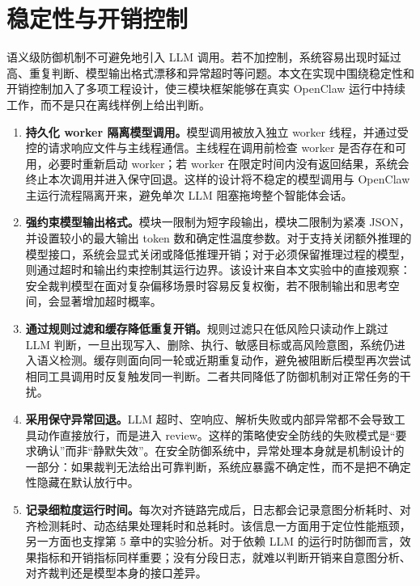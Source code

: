 \section{稳定性与开销控制}

语义级防御机制不可避免地引入 LLM 调用。若不加控制，系统容易出现时延过高、重复判断、模型输出格式漂移和异常超时等问题。本文在实现中围绕稳定性和开销控制加入了多项工程设计，使三模块框架能够在真实 OpenClaw 运行中持续工作，而不是只在离线样例上给出判断。

\begin{enumerate}[label=\arabic*., leftmargin=2.2em]
  \item \textbf{持久化 worker 隔离模型调用。}模型调用被放入独立 worker 线程，并通过受控的请求响应文件与主线程通信。主线程在调用前检查 worker 是否存在和可用，必要时重新启动 worker；若 worker 在限定时间内没有返回结果，系统会终止本次调用并进入保守回退。这样的设计将不稳定的模型调用与 OpenClaw 主运行流程隔离开来，避免单次 LLM 阻塞拖垮整个智能体会话。

  \item \textbf{强约束模型输出格式。}模块一限制为短字段输出，模块二限制为紧凑 JSON，并设置较小的最大输出 token 数和确定性温度参数。对于支持关闭额外推理的模型接口，系统会显式关闭或降低推理开销；对于必须保留推理过程的模型，则通过超时和输出约束控制其运行边界。该设计来自本文实验中的直接观察：安全裁判模型在面对复杂偏移场景时容易反复权衡，若不限制输出和思考空间，会显著增加超时概率。

  \item \textbf{通过规则过滤和缓存降低重复开销。}规则过滤只在低风险只读动作上跳过 LLM 判断，一旦出现写入、删除、执行、敏感目标或高风险意图，系统仍进入语义检测。缓存则面向同一轮或近期重复动作，避免被阻断后模型再次尝试相同工具调用时反复触发同一判断。二者共同降低了防御机制对正常任务的干扰。

  \item \textbf{采用保守异常回退。}LLM 超时、空响应、解析失败或内部异常都不会导致工具动作直接放行，而是进入 review。这样的策略使安全防线的失败模式是“要求确认”而非“静默失效”。在安全防御系统中，异常处理本身就是机制设计的一部分：如果裁判无法给出可靠判断，系统应暴露不确定性，而不是把不确定性隐藏在默认放行中。

  \item \textbf{记录细粒度运行时间。}每次对齐链路完成后，日志都会记录意图分析耗时、对齐检测耗时、动态结果处理耗时和总耗时。该信息一方面用于定位性能瓶颈，另一方面也支撑第 5 章中的实验分析。对于依赖 LLM 的运行时防御而言，效果指标和开销指标同样重要；没有分段日志，就难以判断开销来自意图分析、对齐裁判还是模型本身的接口差异。
\end{enumerate}


